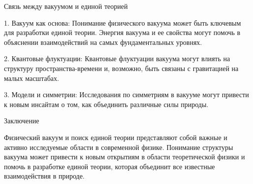 \documentclass[exam_answers.tex]{subfiles}
\begin{document}
Связь между вакуумом и единой теорией

1. Вакуум как основа: Понимание физического вакуума может быть ключевым для разработки единой теории. Энергия вакуума и ее свойства могут помочь в объяснении взаимодействий на самых фундаментальных уровнях.

2. Квантовые флуктуации: Квантовые флуктуации вакуума могут влиять на структуру пространства-времени и, возможно, быть связаны с гравитацией на малых масштабах.

3. Модели и симметрии: Исследования по симметриям в вакууме могут привести к новым инсайтам о том, как объединить различные силы природы.

Заключение

Физический вакуум и поиск единой теории представляют собой важные и активно исследуемые области в современной физике.
Понимание структуры вакуума может привести к новым открытиям в области теоретической физики и помочь в разработке единой теории, которая объединит все известные взаимодействия в природе.
\end{document}
